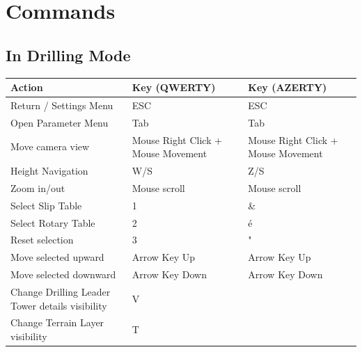 \documentclass{article}
\begin{document}
\newpage
\section{Commands}
\subsection{In Drilling Mode}
\begin{table}[h]
    \begin{tabular}{|l|l|l|}
        \hline
        \textbf{Action} & \textbf{Key (QWERTY)} & \textbf{Key (AZERTY)}\\
        \hline
        Return / Settings Menu & ESC & ESC\\
        \hline
        Open Parameter Menu & Tab & Tab\\
        \hline
        Move camera view & Mouse Right Click + Mouse Movement & Mouse Right Click + Mouse Movement\\
        \hline
        Height Navigation & W/S & Z/S\\
        \hline
        Zoom in/out & Mouse scroll & Mouse scroll\\
        \hline
        Select Slip Table & 1 & \&\\
        \hline
        Select Rotary Table	& 2 & é\\
        \hline
        Reset selection & 3 & "\\
        \hline
        Move selected upward & Arrow Key Up & Arrow Key Up\\
        \hline
        Move selected downward & Arrow Key Down & Arrow Key Down\\
        \hline
        Change Drilling Leader Tower details visibility	& V\\
        \hline
        Change Terrain Layer visibility & T\\
        \hline
    \end{tabular}
\end{table}
\end{document}
